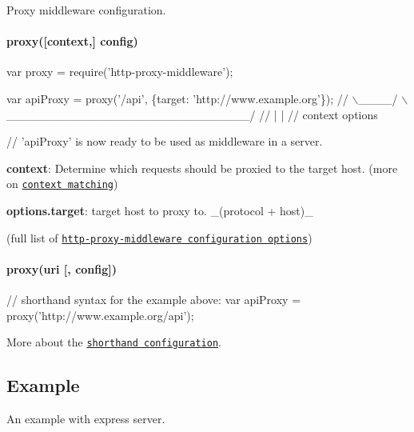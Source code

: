 Proxy middleware configuration.

\paragraph*{proxy(\mbox{[}context,\mbox{]} config)}


\begin{DoxyCode}
var proxy = require('http-proxy-middleware');

var apiProxy = proxy('/api', \{target: 'http://www.example.org'\});
//                   \(\backslash\)\_\_\_\_/   \(\backslash\)\_\_\_\_\_\_\_\_\_\_\_\_\_\_\_\_\_\_\_\_\_\_\_\_\_\_\_\_\_/
//                     |                    |
//                   context             options

// 'apiProxy' is now ready to be used as middleware in a server.
\end{DoxyCode}

\begin{DoxyItemize}
\item {\bfseries context}\+: Determine which requests should be proxied to the target host. (more on \href{#context-matching}{\tt context matching})
\item {\bfseries options.\+target}\+: target host to proxy to. \+\_\+(protocol + host)\+\_\+
\end{DoxyItemize}

(full list of \href{#options}{\tt {\ttfamily http-\/proxy-\/middleware} configuration options})

\paragraph*{proxy(uri \mbox{[}, config\mbox{]})}


\begin{DoxyCode}
// shorthand syntax for the example above:
var apiProxy = proxy('http://www.example.org/api');
\end{DoxyCode}
 More about the \href{#shorthand}{\tt shorthand configuration}.

\subsection*{Example}

An example with {\ttfamily express} server.



